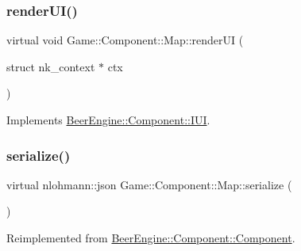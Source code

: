 \mbox{\label{class_game_1_1_component_1_1_map_af062dd2c3e677c1d3d9204cac8508dde}} 
\subsubsection{\texorpdfstring{render\+U\+I()}{renderUI()}}
{\footnotesize\ttfamily virtual void Game\+::\+Component\+::\+Map\+::render\+UI (\begin{DoxyParamCaption}\item[{struct nk\+\_\+context $\ast$}]{ctx }\end{DoxyParamCaption})\hspace{0.3cm}{\ttfamily [virtual]}}



Implements \mbox{\hyperlink{class_beer_engine_1_1_component_1_1_i_u_i_a4a049b1749c1bce80e1fd63538e9fae3}{Beer\+Engine\+::\+Component\+::\+I\+UI}}.

\mbox{\label{class_game_1_1_component_1_1_map_a220f971266cc2b3c5f7b6a10639ec8e6}} 
\subsubsection{\texorpdfstring{serialize()}{serialize()}}
{\footnotesize\ttfamily virtual nlohmann\+::json Game\+::\+Component\+::\+Map\+::serialize (\begin{DoxyParamCaption}{ }\end{DoxyParamCaption})\hspace{0.3cm}{\ttfamily [virtual]}}



Reimplemented from \mbox{\hyperlink{class_beer_engine_1_1_component_1_1_component_a4d82d8a6b22b93514e0585fa4073041f}{Beer\+Engine\+::\+Component\+::\+Component}}.

\mbox{\label{class_game_1_1_component_1_1_map_aaa3da00869732537ac17430774fd8357}} 

